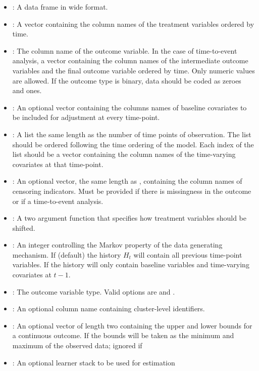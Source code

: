 \documentclass[]{jss}
\begin{document}
\begin{itemize}

  \item {}: A data frame in wide format. 
  \item {}: A vector containing the column names of the treatment variables ordered by time.
  \item {}: The column name of the outcome variable. In the case of time-to-event 
  analysis, a vector containing the column names of the intermediate outcome variables and
  the final outcome variable ordered by time. Only numeric values are allowed. If
  the outcome type is binary, data should be coded as zeroes and ones.
  \item {}: An optional vector containing the columns names of baseline covariates
  to be included for adjustment at every time-point.
  \item {}: A list the same length as the number of time points of observation.
  The list should be ordered following the time ordering of the model.
  Each index of the list should be a vector containing the column names of the time-varying covariates
  at that time-point. 
  \item {}: An optional vector, the same length as , containing
  the column names of censoring indicators. Must be provided if there is missingness in the outcome or
  if a time-to-event analysis.
  \item {}: A two argument function that specifies how treatment variables should be shifted.
  \item {}: An integer controlling the Markov property of the data generating mechanism. If 
  (default) the history \(H_t\) will contain all previous time-point variables. If  the history will
  only contain baseline variables and time-varying covariates at \(t - 1\).
  \item {}: The outcome variable type. Valid options are  and .
  \item {}: An optional column name containing cluster-level identifiers.
  \item {}: An optional vector of length two containing the upper and lower bounds
  for a continuous outcome. If  the bounds will be taken as the minimum and maximum
   of the observed data; ignored if 
  \item {}: An optional  learner stack to be used for estimation

\end{itemize}
\end{document}
